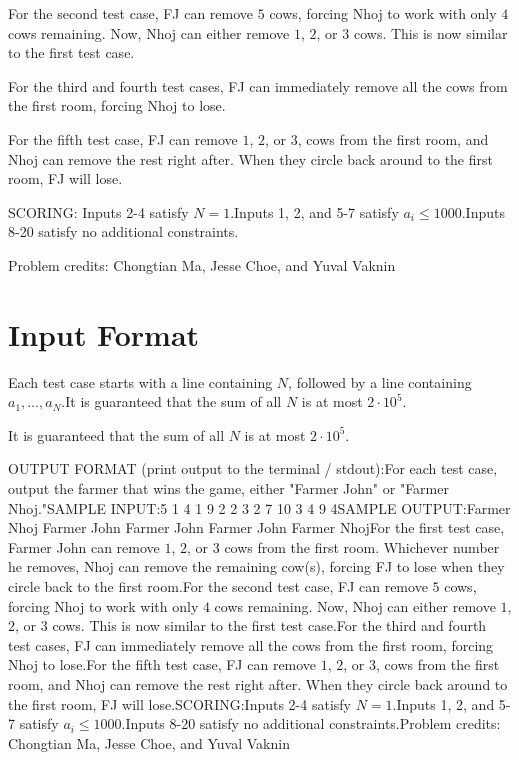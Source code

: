 \documentclass[12pt]{article}
\begin{document}
For the second test case, FJ can remove $5$ cows, forcing Nhoj to work with only
$4$ cows remaining. Now, Nhoj can either remove $1$, $2$, or $3$ cows. This is
now similar to the first test case.

For the third and fourth test cases, FJ can immediately remove all the cows from
the first room, forcing Nhoj to lose.

For the fifth test case, FJ can remove $1$, $2$, or $3$, cows from the first
room, and Nhoj can remove the rest right after. When they circle back around to
the first room, FJ will lose.

SCORING:
Inputs 2-4 satisfy $N=1$.Inputs 1, 2, and 5-7 satisfy $a_i\le 1000$.Inputs 8-20 satisfy no additional constraints.


Problem credits: Chongtian Ma, Jesse Choe, and Yuval Vaknin



\section*{Input Format}
Each test case starts with a line containing $N$, followed by a line containing
$a_1,\dots,a_N$.It is guaranteed that the sum of all $N$ is at most
$2\cdot 10^5$.

It is guaranteed that the sum of all $N$ is at most
$2\cdot 10^5$.

OUTPUT FORMAT (print output to the terminal / stdout):For each test case, output the farmer that wins the game, either "Farmer John"
or "Farmer Nhoj."SAMPLE INPUT:5
1
4
1
9
2
2 3
2
7 10
3
4 9 4SAMPLE OUTPUT:Farmer Nhoj
Farmer John
Farmer John
Farmer John
Farmer NhojFor the first test case, Farmer John can remove $1$, $2$, or $3$ cows from  the
first room. Whichever number he removes, Nhoj can remove the remaining cow(s),
forcing FJ to lose when they circle back to the first room.For the second test case, FJ can remove $5$ cows, forcing Nhoj to work with only
$4$ cows remaining. Now, Nhoj can either remove $1$, $2$, or $3$ cows. This is
now similar to the first test case.For the third and fourth test cases, FJ can immediately remove all the cows from
the first room, forcing Nhoj to lose.For the fifth test case, FJ can remove $1$, $2$, or $3$, cows from the first
room, and Nhoj can remove the rest right after. When they circle back around to
the first room, FJ will lose.SCORING:Inputs 2-4 satisfy $N=1$.Inputs 1, 2, and 5-7 satisfy $a_i\le 1000$.Inputs 8-20 satisfy no additional constraints.Problem credits: Chongtian Ma, Jesse Choe, and Yuval Vaknin
\end{document}
